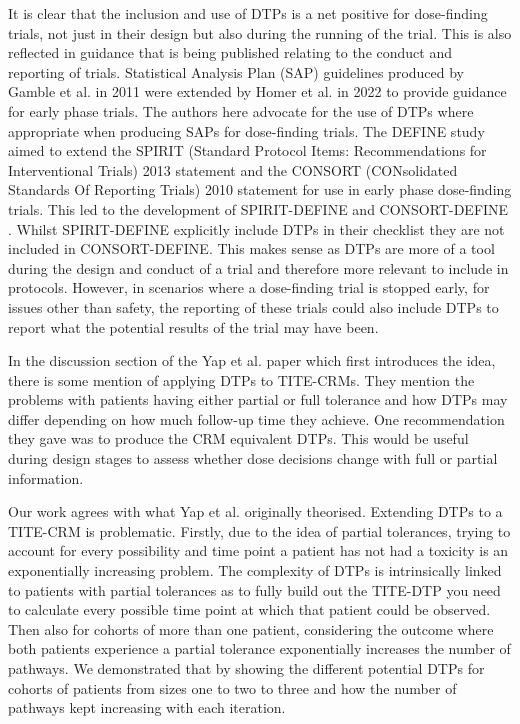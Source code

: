 It is clear that the inclusion and use of DTPs is a net positive for dose-finding trials, not just in their design but also during the running of the trial. This is also reflected in guidance that is being published relating to the conduct and reporting of trials. Statistical Analysis Plan (SAP) guidelines produced by Gamble et al. \cite{gambleGuidelinesContentStatistical2017} in 2011 were extended by Homer et al. \cite{homerEarlyPhaseClinical2022} in 2022 to provide guidance for early phase trials. The authors here advocate for the use of DTPs where appropriate when producing SAPs for dose-finding trials. The DEFINE study \cite{solovyevaDevelopmentConsensusdrivenSPIRIT2023} aimed to extend the SPIRIT (Standard Protocol Items: Recommendations for Interventional Trials) 2013 statement \cite{chanSPIRIT2013Statement2013} and the CONSORT (CONsolidated Standards Of Reporting Trials) 2010 statement \cite{moherCONSORT2010Explanation2010} for use in early phase dose-finding trials. This led to the development of SPIRIT-DEFINE \cite{yapEnhancingQualityImpact2023} and CONSORT-DEFINE \cite{yapEnhancingReportingQuality2023}. Whilst SPIRIT-DEFINE explicitly include DTPs in their checklist they are not included in CONSORT-DEFINE. This makes sense as DTPs are more of a tool during the design and conduct of a trial and therefore more relevant to include in protocols. However, in scenarios where a dose-finding trial is stopped early, for issues other than safety, the reporting of these trials could also include DTPs to report what the potential results of the trial may have been. 

In the discussion section of the Yap et al. \cite{yapDoseTransitionPathways2017} paper which first introduces the idea, there is some mention of applying DTPs to TITE-CRMs. They mention the problems with patients having either partial or full tolerance and how DTPs may differ depending on how much follow-up time they achieve. One recommendation they gave was to produce the CRM equivalent DTPs. This would be useful during design stages to assess whether dose decisions change with full or partial information. 

Our work agrees with what Yap et al. \cite{yapDoseTransitionPathways2017} originally theorised. Extending DTPs to a TITE-CRM is problematic. Firstly, due to the idea of partial tolerances, trying to account for every possibility and time point a patient has not had a toxicity is an exponentially increasing problem. The complexity of DTPs is intrinsically linked to patients with partial tolerances as to fully build out the TITE-DTP you need to calculate every possible time point at which that patient could be observed. Then also for cohorts of more than one patient, considering the outcome where both patients experience a partial tolerance exponentially increases the number of pathways. We demonstrated that by showing the different potential DTPs for cohorts of patients from sizes one to two to three and how the number of pathways kept increasing with each iteration. 

